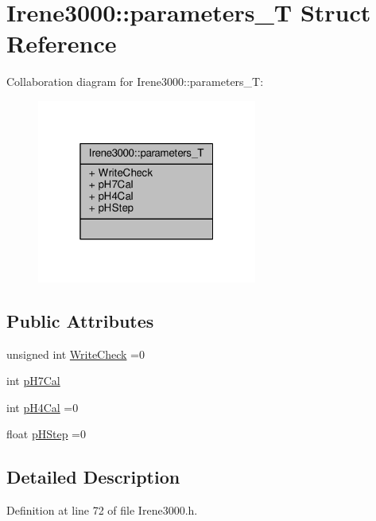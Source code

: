 \hypertarget{structIrene3000_1_1parameters__T}{}\section{Irene3000\+:\+:parameters\+\_\+T Struct Reference}
\label{structIrene3000_1_1parameters__T}


Collaboration diagram for Irene3000\+:\+:parameters\+\_\+T\+:\nopagebreak
\begin{figure}[H]
\begin{center}
\leavevmode
\includegraphics[width=205pt]{structIrene3000_1_1parameters__T__coll__graph}
\end{center}
\end{figure}
\subsection*{Public Attributes}
\begin{DoxyCompactItemize}
\item 
unsigned int \hyperlink{structIrene3000_1_1parameters__T_a56f1f14d33a69300d580eda2dc52cecd}{Write\+Check} =0
\item 
int \hyperlink{structIrene3000_1_1parameters__T_a21265466a570d84bff914f26d2f7a03e}{p\+H7\+Cal}
\item 
int \hyperlink{structIrene3000_1_1parameters__T_a1144de6fb54eb3e1dd2a3d8c2afc97dc}{p\+H4\+Cal} =0
\item 
float \hyperlink{structIrene3000_1_1parameters__T_a61cfcc2539d5f630e9071f3753aba9fe}{p\+H\+Step} =0
\end{DoxyCompactItemize}


\subsection{Detailed Description}


Definition at line 72 of file Irene3000.\+h.



